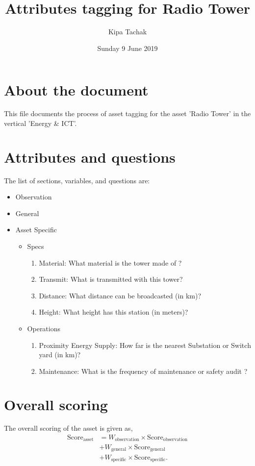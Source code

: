 \documentclass[oneside,twocolumn]{article}
\title{Attributes tagging for Radio Tower}
\author{Kipa Tachak}
\date{Sunday  9 June 2019}
\newcommand{\tsub}[2]{\text{#1}_{\text{#2}}}
\newcommand{\tsubb}[2]{#1_{\text{#2}}}
\begin{document}
\maketitle

\section{About the document}
This file documents the process of asset tagging for the asset 'Radio Tower' in the
vertical 'Energy \& ICT'.

\section{Attributes and questions}
The list of sections, variables, and questions are:
    \begin{itemize}
    \item Observation
    \item General
    \item Asset Specific
    \begin{itemize}
\item Specs
\begin{enumerate}
\item Material: What material is the tower made of ?
\item Transmit: What is transmitted with this tower?
\item Distance: What distance can be broadcasted (in km)?
\item Height: What height has this station (in meters)?
\end{enumerate}

\item Operations
\begin{enumerate}
\item Proximity Energy Supply: How far is the nearest Substation or Switch yard (in km)?
\item Maintenance: What is the frequency of  maintenance or safety audit ?
\end{enumerate}

\end{itemize}

    \end{itemize}
\section{Overall scoring}
The overall scoring of the asset is given as,
\begin{align*}
	\tsub{Score}{asset} &= \tsubb{W}{observation} \times \tsub{Score}{observation} \\
	&+ \tsubb{W}{general} \times \tsub{Score}{general} \\
	&+ \tsubb{W}{specific} \times \tsub{Score}{specific}.
\end{align*}
\end{document}

